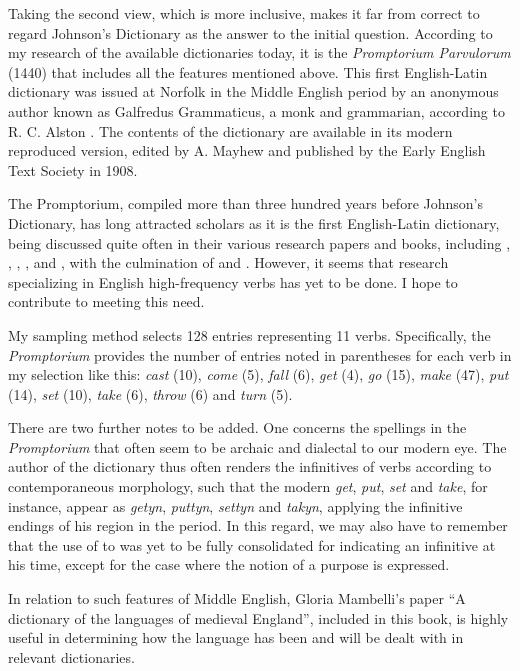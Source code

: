 \documentclass[output=paper,colorlinks,citecolor=brown,arabicfont,chinesefont]{langscibook}
\begin{document}
Taking the second view, which is more inclusive, makes it far from correct to regard Johnson’s Dictionary as the answer to the initial question. According to my research of the available dictionaries today, it is the \textit{Promptorium Parvulorum} (1440) that includes all the features mentioned above. This first English-Latin dictionary was issued at Norfolk in the Middle English period by an anonymous author known as Galfredus Grammaticus, a monk and grammarian, according to R. C. Alston \citet{Alston1968}. The contents of the dictionary are available in its modern reproduced version, edited by A. Mayhew and published by the Early English Text Society in 1908.

The Promptorium, compiled more than three hundred years before Johnson’s Dictionary, has long attracted scholars as it is the first English-Latin dictionary, being discussed quite often in their various research papers and books, including \citet{Wheatley1865}, \citet{StarnesNoyes1946},  \citet{Wells1973}, \citet{Hullen2006}, \citet{Sauer2009} and \citet{Bately2009}, with the culmination of \citet{Stein1985} and \citet{Stein1997}.  However, it seems that research specializing in English high-frequency verbs has yet to be done. I hope to contribute to meeting this need.

My sampling method selects 128 entries representing 11 verbs. Specifically, the \textit{Promptorium} provides the number of entries noted in parentheses for each verb in my selection like this: \textit{cast} (10), \textit{come} (5), \textit{fall} (6), \textit{get} (4), \textit{go} (15), \textit{make} (47), \textit{put} (14), \textit{set} (10), \textit{take} (6), \textit{throw} (6) and \textit{turn} (5).

There are two further notes to be added. One concerns the spellings in the \textit{Promptorium} that often seem to be archaic and dialectal to our modern eye. The author of the dictionary thus often renders the infinitives of verbs according to contemporaneous morphology, such that the modern \textit{get}, \textit{put}, \textit{set} and \textit{take}, for instance, appear as \textit{getyn}, \textit{puttyn}, \textit{settyn} and \textit{takyn}, applying the infinitive endings of his region in the period. In this regard, we may also have to remember that the use of to was yet to be fully consolidated for indicating an infinitive at his time, except for the case where the notion of a purpose is expressed.

In relation to such features of Middle English, Gloria Mambelli’s paper “A dictionary of the languages of medieval England”, included in this book, is highly useful in determining how the language has been and will be dealt with in relevant dictionaries.
\end{document}
